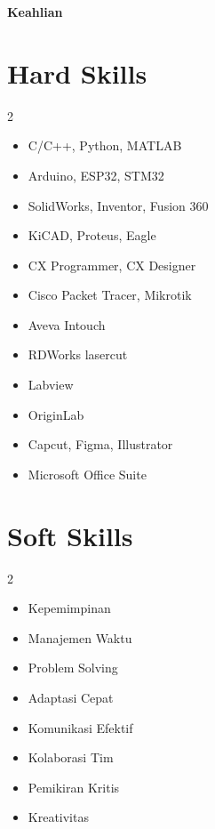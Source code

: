 \documentclass[a4paper,11pt]{article}
\begin{document}
	\pagebreak
	
	\vspace{1em}
	\begin{center}
		{\large\bfseries Keahlian}\\[-0.6em]
		\noindent\makebox[\linewidth]{\rule{\textwidth}{0.4pt}}
	\end{center}
	
	\section*{Hard Skills}
	\begin{multicols}{2}
		\begin{itemize}
			\item C/C++, Python, MATLAB
			\item Arduino, ESP32, STM32
			\item SolidWorks, Inventor, Fusion 360
			\item KiCAD, Proteus, Eagle
			\item CX Programmer, CX Designer
			\item Cisco Packet Tracer, Mikrotik
			\item Aveva Intouch
			\item RDWorks lasercut
			\item Labview
			\item OriginLab
			\item Capcut, Figma, Illustrator
			\item Microsoft Office Suite
		\end{itemize}
	\end{multicols}
	
	\section*{Soft Skills}
	\begin{multicols}{2}
		\begin{itemize}
			\item Kepemimpinan
			\item Manajemen Waktu
			\item Problem Solving
			\item Adaptasi Cepat
			\item Komunikasi Efektif
			\item Kolaborasi Tim
			\item Pemikiran Kritis
			\item Kreativitas
		\end{itemize}
	\end{multicols}
	
\end{document}
